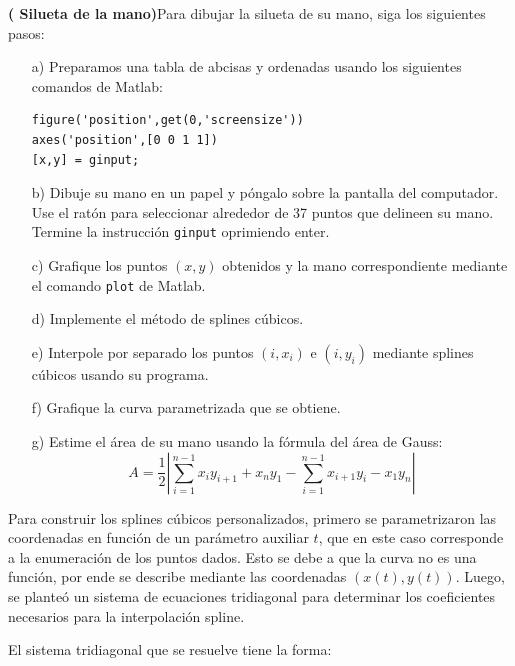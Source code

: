 \begin{homeworkProblem}
  \textbf{( Silueta de la mano)}Para dibujar la silueta de su mano, siga los siguientes pasos:

\begin{enumerate}
    \item[a)] Preparamos una tabla de abcisas y ordenadas usando los siguientes comandos de Matlab:
    \begin{verbatim}
figure('position',get(0,'screensize'))
axes('position',[0 0 1 1])
[x,y] = ginput;
    \end{verbatim}

    \item[b)] Dibuje su mano en un papel y póngalo sobre la pantalla del computador. Use el ratón para seleccionar alrededor de 37 puntos que delineen su mano. Termine la instrucción \texttt{ginput} oprimiendo enter.

    \item[c)] Grafique los puntos $(x, y)$ obtenidos y la mano correspondiente mediante el comando \texttt{plot} de Matlab.

    \item[d)] Implemente el método de splines cúbicos.

    \item[e)] Interpole por separado los puntos $(i, x_i)$ e $(i, y_i)$ mediante splines cúbicos usando su programa.

    \item[f)] Grafique la curva parametrizada que se obtiene.

    \item[g)] Estime el área de su mano usando la fórmula del área de Gauss:
    \[
    A = \frac{1}{2} \left| \sum_{i=1}^{n-1} x_i y_{i+1} + x_n y_1 - \sum_{i=1}^{n-1} x_{i+1} y_i - x_1 y_n \right|
    \]
\end{enumerate}
  \begin{solucion}
    Para construir los splines cúbicos personalizados, primero se parametrizaron las coordenadas en función de un parámetro auxiliar $t$, que en este caso corresponde a la enumeración de los puntos dados. Esto se debe a que la curva no es una función, por ende se describe mediante las coordenadas $(x(t), y(t))$. Luego, se planteó un sistema de ecuaciones tridiagonal para determinar los coeficientes necesarios para la interpolación spline.

El sistema tridiagonal que se resuelve tiene la forma:


\end{solucion}
\end{homeworkProblem}
